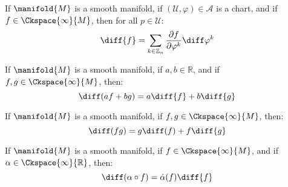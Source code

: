 \documentclass{article}                                                        %
\begin{document}
            \begin{theorem}
                If $\manifold{M}$ is a smooth manifold, if
                $(\mathcal{U},\varphi)\in\mathcal{A}$ is a chart, and if
                $f\in\Ckspace{\infty}{M}$, then for all $p\in\mathcal{U}$:
                \begin{equation}
                    \diff{f}=\sum_{k\in\mathbb{Z}_{n}}
                        \frac{\partial{f}}{\partial\varphi^{k}}
                            \diff\varphi^{k}
                \end{equation}
            \end{theorem}
            \begin{theorem}
                If $\manifold{M}$ is a smooth manifold, if $a,b\in\mathbb{R}$,
                and if $f,g\in\Ckspace{\infty}{M}$, then:
                \begin{equation}
                    \diff(af+bg)=a\diff{f}+b\diff{g}
                \end{equation}
            \end{theorem}
            \begin{theorem}
                If $\manifold{M}$ is a smooth manifold, if
                $f,g\in\Ckspace{\infty}{M}$, then:
                \begin{equation}
                    \diff(fg)=g\diff(f)+f\diff{g}
                \end{equation}
            \end{theorem}
            \begin{theorem}
                If $\manifold{M}$ is a smooth manifold, if
                $f\in\Ckspace{\infty}{M}$, and if
                $\alpha\in\Ckspace{\infty}{\mathbb{R}}$, then:
                \begin{equation}
                    \diff(\alpha\circ{f})=\dot{\alpha}(f)\diff{f}
                \end{equation}
            \end{theorem}
\end{document}

